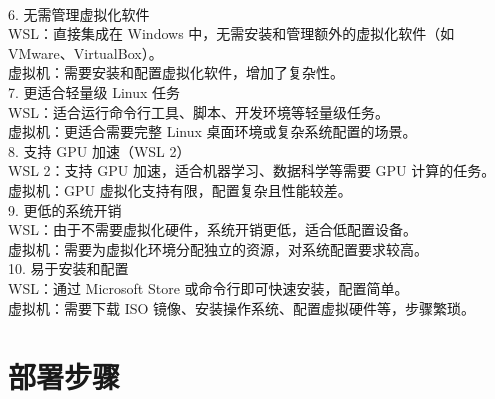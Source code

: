 \documentclass{article}
\begin{document}
\\6. 无需管理虚拟化软件
\\ \indent WSL：直接集成在 Windows 中，无需安装和管理额外的虚拟化软件（如 VMware、VirtualBox）。
\\ \indent 虚拟机：需要安装和配置虚拟化软件，增加了复杂性。
\\7. 更适合轻量级 Linux 任务
\\ \indent WSL：适合运行命令行工具、脚本、开发环境等轻量级任务。
\\ \indent 虚拟机：更适合需要完整 Linux 桌面环境或复杂系统配置的场景。
\\8. 支持 GPU 加速（WSL 2）
\\ \indent WSL 2：支持 GPU 加速，适合机器学习、数据科学等需要 GPU 计算的任务。
\\ \indent 虚拟机：GPU 虚拟化支持有限，配置复杂且性能较差。
\\9. 更低的系统开销
\\ \indent WSL：由于不需要虚拟化硬件，系统开销更低，适合低配置设备。
\\ \indent 虚拟机：需要为虚拟化环境分配独立的资源，对系统配置要求较高。
\\10. 易于安装和配置
\\ \indent WSL：通过 Microsoft Store 或命令行即可快速安装，配置简单。
\\ \indent 虚拟机：需要下载 ISO 镜像、安装操作系统、配置虚拟硬件等，步骤繁琐。

\section{部署步骤}
\end{document}
